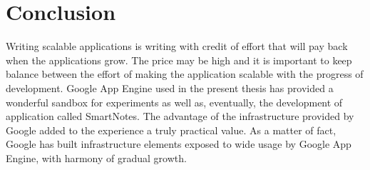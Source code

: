 \chapter{Conclusion}
Writing scalable applications is writing with credit of effort that will pay back when the applications grow. The price may be high and it is important to keep balance between the effort of making the application scalable with the progress of development. Google App Engine used in the present thesis has provided a wonderful sandbox for experiments as well as, eventually, the development of application called SmartNotes. The advantage of  the infrastructure provided by Google added to the experience a truly practical value. As a matter of fact, Google has built infrastructure elements exposed to wide usage by Google App Engine,  with harmony of gradual growth. 

